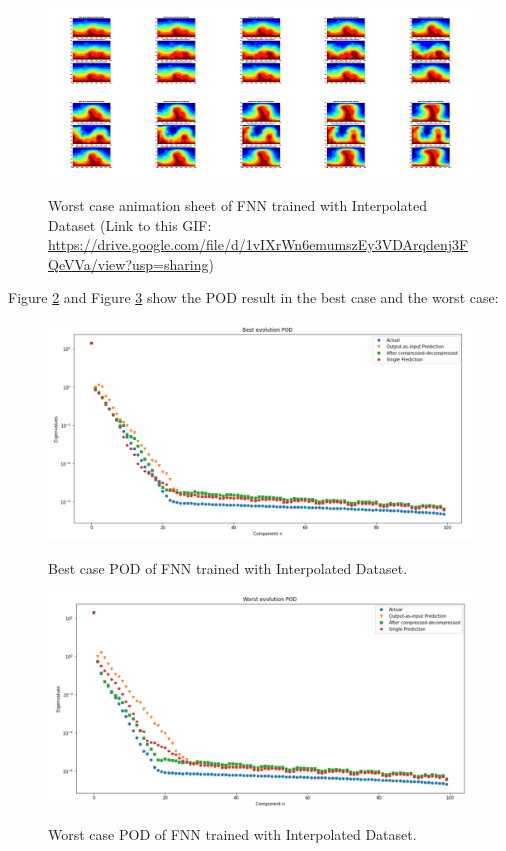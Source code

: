 \begin{figure}[H]
    \centering
    \caption{Worst case animation sheet of FNN trained with Interpolated Dataset (Link to this GIF: 
    \url{https://drive.google.com/file/d/1vIXrWn6emumszEy3VDArqdenj3FQeVVa/view?usp=sharing})}
    \includegraphics[scale=0.10]{figures/mantle_convection_images/larger_dataset_interpolated/FNN_Worst_GIF_sheet.png}
    \label{figure:FNN_interpolated_worst_gif}
\end{figure}

Figure \ref{figure:FNN_interpolated_best_POD} and Figure \ref{figure:FNN_interpolated_worst_POD} show the POD result in the best case and the worst case:

\begin{figure}[H]
    \caption{Best case POD of FNN trained with Interpolated Dataset.}
    \includegraphics[scale=0.5]{figures/mantle_convection_images/larger_dataset_interpolated/FNN_Best_POD.png}
    \label{figure:FNN_interpolated_best_POD}
\end{figure}

\begin{figure}[H]
    \caption{Worst case POD of FNN trained with Interpolated Dataset.}
    \includegraphics[scale=0.5]{figures/mantle_convection_images/larger_dataset_interpolated/FNN_Worst_POD.png}
    \label{figure:FNN_interpolated_worst_POD}
\end{figure}

